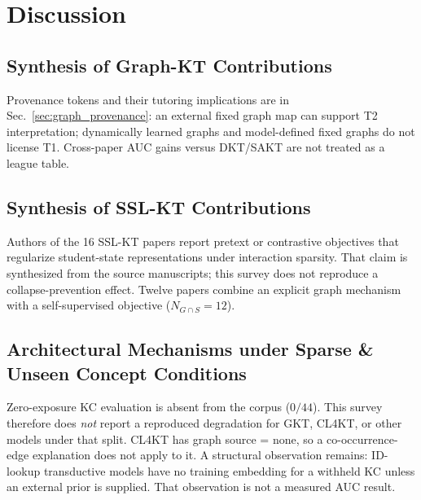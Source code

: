 \documentclass[lettersize,journal]{IEEEtran}
\begin{document}
\section{Discussion}
\label{sec:discussion}

\subsection{Synthesis of Graph-KT Contributions}
Provenance tokens and their tutoring implications are in Sec.~\ref{sec:graph_provenance}: an external fixed graph map can support T2 interpretation; dynamically learned graphs and model-defined fixed graphs do not license T1. Cross-paper AUC gains versus DKT/SAKT are not treated as a league table.

\subsection{Synthesis of SSL-KT Contributions}
Authors of the 16 SSL-KT papers report pretext or contrastive objectives that regularize student-state representations under interaction sparsity. That claim is synthesized from the source manuscripts; this survey does not reproduce a collapse-prevention effect. Twelve papers combine an explicit graph mechanism with a self-supervised objective ($N_{G \cap S} = 12$).

\subsection{Architectural Mechanisms under Sparse \& Unseen Concept Conditions}
Zero-exposure KC evaluation is absent from the corpus ($0/44$). This survey therefore does \emph{not} report a reproduced degradation for GKT, CL4KT, or other models under that split. CL4KT has graph source = none, so a co-occurrence-edge explanation does not apply to it. A structural observation remains: ID-lookup transductive models have no training embedding for a withheld KC unless an external prior is supplied. That observation is not a measured AUC result.
\end{document}
